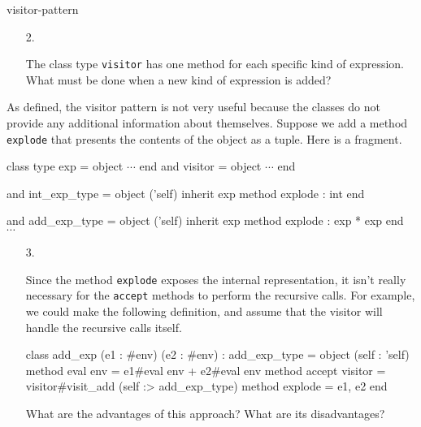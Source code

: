 \begin{exercise}{visitor-pattern}
\begin{enumerate}
\begin{enumerate}
\begin{ocaml}
class type exp =
  object ('self)
    method eval : int env -> int
    method accept : visitor -> unit
  end

and visitor =
  object ('self)
    method visit_int : exp -> unit
    method visit_var : exp -> unit
    $\cdots$
  end
\end{ocaml}

\item

What is a better way to solve this problem?
\end{enumerate}

\item[2.]

The class type \hbox{\lstinline$visitor$} has one method for each specific
kind of expression.  What must be done when a new kind of expression
is added?
\end{enumerate}
%
As defined, the visitor pattern is not very useful because the classes
do not provide any additional information about themselves.  Suppose
we add a method \hbox{\lstinline$explode$} that presents the contents
of the object as a tuple.  Here is a fragment.

\begin{ocaml}
class type exp = object $\cdots$ end
and visitor = object $\cdots$ end

and int_exp_type =
  object ('self)
    inherit exp
    method explode : int
  end

and add_exp_type =
  object ('self)
    inherit exp
    method explode : exp * exp
  end
$\cdots$
\end{ocaml}

\begin{enumerate}
\item[3.]

Since the method \hbox{\lstinline$explode$} exposes the internal representation,
it isn't really necessary for the \hbox{\lstinline$accept$} methods to perform the
recursive calls.  For example, we could make the following definition,
and assume that the visitor will handle the recursive calls itself.

\begin{ocaml}
class add_exp (e1 : #env) (e2 : #env) : add_exp_type =
  object (self : 'self)
    method eval env = e1#eval env + e2#eval env
    method accept visitor = visitor#visit_add (self :> add_exp_type)
    method explode = e1, e2
  end
\end{ocaml}
%
What are the advantages of this approach?  What are its disadvantages?


\end{enumerate}
\end{exercise}
